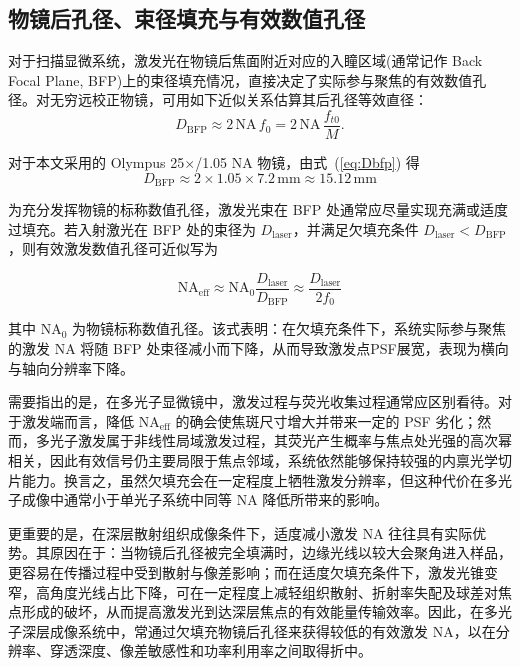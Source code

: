 \subsection{物镜后孔径、束径填充与有效数值孔径}\label{2.4.2}

对于扫描显微系统，激发光在物镜后焦面附近对应的入瞳区域(通常记作 Back Focal Plane, BFP)上的束径填充情况，直接决定了实际参与聚焦的有效数值孔径。对无穷远校正物镜，可用如下近似关系估算其后孔径等效直径：
\begin{equation}
  D_{\mathrm{BFP}}\approx 2\,\mathrm{NA}\,f_0
  =2\,\mathrm{NA}\,\frac{f_{t0}}{M}.
  \label{eq:Dbfp}
\end{equation}

对于本文采用的 Olympus 25$\times$/1.05 NA 物镜，由式~(\ref{eq:Dbfp}) 得
\begin{equation}
  D_{\mathrm{BFP}}\approx 2\times1.05\times7.2\,\mathrm{mm}\approx 15.12\,\mathrm{mm}
  \label{eq:Dbfp_olympus}
\end{equation}

为充分发挥物镜的标称数值孔径，激发光束在 BFP 处通常应尽量实现充满或适度过填充。若入射激光在 BFP 处的束径为 $D_{\mathrm{laser}}$，并满足欠填充条件 $D_{\mathrm{laser}}<D_{\mathrm{BFP}}$，则有效激发数值孔径可近似写为

\begin{equation}
  \mathrm{NA}_{\mathrm{eff}}\approx \mathrm{NA}_{0}\frac{D_{\mathrm{laser}}}{D_{\mathrm{BFP}}}
  \approx \frac{D_{\mathrm{laser}}}{2f_0}
  \label{eq:NAeff}
\end{equation}

其中 $\mathrm{NA}_{0}$ 为物镜标称数值孔径。该式表明：在欠填充条件下，系统实际参与聚焦的激发 NA 将随 BFP 处束径减小而下降，从而导致激发点PSF展宽，表现为横向与轴向分辨率下降。

需要指出的是，在多光子显微镜中，激发过程与荧光收集过程通常应区别看待。对于激发端而言，降低 $\mathrm{NA}_{\mathrm{eff}}$ 的确会使焦斑尺寸增大并带来一定的 PSF 劣化；然而，多光子激发属于非线性局域激发过程，其荧光产生概率与焦点处光强的高次幂相关，因此有效信号仍主要局限于焦点邻域，系统依然能够保持较强的内禀光学切片能力。换言之，虽然欠填充会在一定程度上牺牲激发分辨率，但这种代价在多光子成像中通常小于单光子系统中同等 NA 降低所带来的影响。

更重要的是，在深层散射组织成像条件下，适度减小激发 NA 往往具有实际优势\cite{RN372}。其原因在于：当物镜后孔径被完全填满时，边缘光线以较大会聚角进入样品，更容易在传播过程中受到散射与像差影响；而在适度欠填充条件下，激发光锥变窄，高角度光线占比下降，可在一定程度上减轻组织散射、折射率失配及球差对焦点形成的破坏，从而提高激发光到达深层焦点的有效能量传输效率。因此，在多光子深层成像系统中，常通过欠填充物镜后孔径来获得较低的有效激发 NA，以在分辨率、穿透深度、像差敏感性和功率利用率之间取得折中。

